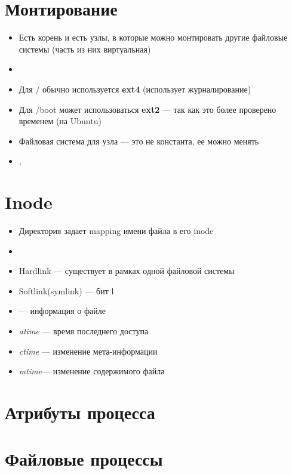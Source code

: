 \documentclass[../lectures.tex]{subfiles}
\begin{document}
\section{Монтирование}
\begin{itemize}
    \item Есть корень и есть узлы, в которые можно монтировать другие файловые системы (часть из них виртуальная)
    \item {}
    \item Для $/$ обычно используется \textbf{ext4} (использует журналирование)
    \item Для /boot может использоваться \textbf{ext2} --- так как это более проверено временем (на Ubuntu)
    \item Файловая система для узла --- это не константа, ее можно менять
    \item {}, 
\end{itemize}

\section{Inode}
\begin{itemize}
    \item Директория задает mapping имени файла в его inode
    \item {}
    \item Hardlink --- существует в рамках одной файловой системы
    \item Softlink(symlink) --- бит l
    \item {} --- информация о файле
    \item \emph{atime} --- время последнего доступа
    \item \emph{ctime} --- изменение мета-информации
    \item \emph{mtime}--- изменение содержимого файла
\end{itemize}

\section{Атрибуты процесса}
\todo{}

\section{Файловые процессы}
\todo{}
\end{document}

